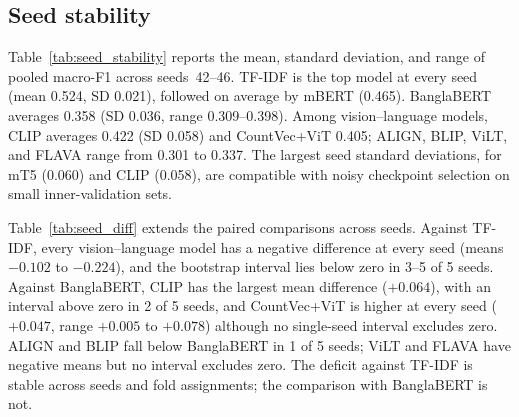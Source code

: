 \documentclass[11pt]{article}
\begin{document}
\subsection{Seed stability}\label{sec:seeds}
Table~\ref{tab:seed_stability} reports the mean, standard deviation, and range of pooled macro-F1 across seeds~42--46. %
TF-IDF is the top model at every seed (mean 0.524, SD 0.021), followed on average by mBERT (0.465). BanglaBERT averages 0.358 (SD 0.036, range 0.309--0.398). Among vision--language models, CLIP averages 0.422 (SD 0.058) and CountVec+ViT 0.405; ALIGN, BLIP, ViLT, and FLAVA range from 0.301 to 0.337. The largest seed standard deviations, for mT5 (0.060) and CLIP (0.058), are compatible with noisy checkpoint selection on small inner-validation sets.

\begin{table}[t]
\footnotesize
\setlength{\tabcolsep}{3pt}
\centering
\caption{Macro-F1 across five seeds (42--46) on 149 readable-image items. SD is sample standard deviation; Range is min--max.}\label{tab:seed_stability}
\end{table}

Table~\ref{tab:seed_diff} extends the paired comparisons across seeds. %
Against TF-IDF, every vision--language model has a negative difference at every seed (means $-0.102$ to $-0.224$), and the bootstrap interval lies below zero in 3--5 of 5 seeds. Against BanglaBERT, CLIP has the largest mean difference ($+0.064$), with an interval above zero in 2 of 5 seeds, and CountVec+ViT is higher at every seed ($+0.047$, range $+0.005$ to $+0.078$) although no single-seed interval excludes zero. ALIGN and BLIP fall below BanglaBERT in 1 of 5 seeds; ViLT and FLAVA have negative means but no interval excludes zero. The deficit against TF-IDF is stable across seeds and fold assignments; the comparison with BanglaBERT is not.
\end{document}
